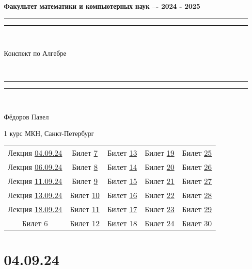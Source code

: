 \documentclass[12pt, a4paper]{article}
\theoremstyle{plain}
\theoremstyle{definition}
\begin{document}
\thispagestyle{empty}
\begin{center}
    \bf{Факультет математики и компьютерных наук –- 2024 - 2025}
\end{center}
\vspace{18mm}
\rule[0.5ex]{\linewidth}{2pt}\vspace*{-\baselineskip}\vspace*{3.2pt} 
\rule[0.5ex]{\linewidth}{1pt}\\[6mm] 
{ \sc \centerline{\huge Конспект по Алгебре}}\\[5mm] 
\rule[0.5ex]{\linewidth}{1pt}\vspace*{-\baselineskip}\vspace{3.2pt} 
\rule[0.5ex]{\linewidth}{2pt}\\ 
\vspace{5mm}
\begin{center}
    \Huge{Фёдоров Павел\\}
    \vspace{6mm}
    
    {\small 1 курс МКН, Санкт-Петербург}

\newpage

\Large
\hypertarget{p35}{}
\begin{tabular}{ccccc}
 Лекция \hyperlink{p1}{04.09.24} & Билет \hyperlink{p7}{7} & Билет \hyperlink{p13}{13} & Билет \hyperlink{p19}{19} & Билет \hyperlink{p25}{25}\\
 Лекция \hyperlink{p2}{06.09.24} & Билет \hyperlink{p8}{8} & Билет \hyperlink{p14}{14} & Билет \hyperlink{p20}{20} & Билет \hyperlink{p26}{26}\\
 Лекция \hyperlink{p3}{11.09.24} & Билет \hyperlink{p9}{9} & Билет \hyperlink{p15}{15} & Билет \hyperlink{p21}{21} & Билет \hyperlink{p27}{27}\\
 Лекция \hyperlink{p4}{13.09.24} & Билет \hyperlink{p10}{10} & Билет \hyperlink{p16}{16} & Билет \hyperlink{p22}{22} & Билет \hyperlink{p28}{28}\\
 Лекция \hyperlink{p5}{18.09.24} & Билет \hyperlink{p11}{11} & Билет \hyperlink{p17}{17} & Билет \hyperlink{p23}{23} & Билет \hyperlink{p29}{29}\\
 Билет \hyperlink{p6}{6} & Билет \hyperlink{p12}{12} & Билет \hyperlink{p18}{18} & Билет \hyperlink{p24}{24} & Билет \hyperlink{p30}{30}\\
\end{tabular}
\end{center}

\normalsize
\hypertarget{p1}{}
\section*{04.09.24}
\end{document}
